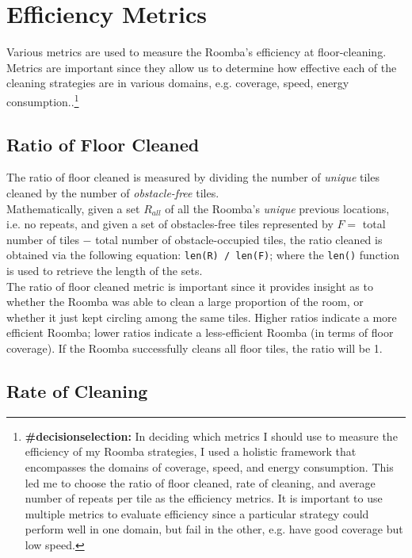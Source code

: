 \documentclass[11pt]{article}
\begin{document}
\section{Efficiency Metrics}

Various metrics are used to measure the Roomba's efficiency at
floor-cleaning. Metrics are important since they allow us to determine
how effective each of the cleaning strategies are in various domains,
e.g. coverage, speed, energy consumption..\footnote{\textbf{\#decisionselection:} In deciding which metrics I should use to measure the efficiency of my Roomba strategies, I used a holistic framework that encompasses the domains of coverage, speed, and energy consumption. This led me to choose the ratio of floor cleaned, rate of cleaning, and average number of repeats per tile as the efficiency metrics. It is important to use multiple metrics to evaluate efficiency since a particular strategy could perform well in one domain, but fail in the other, e.g. have good coverage but low speed.}

\subsection{Ratio of Floor Cleaned}

The ratio of floor cleaned is measured by dividing the number of
\emph{unique} tiles cleaned by the number of \emph{obstacle-free} tiles.\\

Mathematically, given a set \(R_{all}\) of all the Roomba's
\emph{unique} previous locations, i.e. no repeats, and given a set of
obstacles-free tiles represented by \(F =\) total number of tiles \(-\)
total number of obstacle-occupied tiles, the ratio cleaned is obtained
via the following equation: \texttt{len(R)\ /\ len(F)}; where the
\texttt{len()} function is used to retrieve the length of the sets.\\

The ratio of floor cleaned metric is important since it provides insight
as to whether the Roomba was able to clean a large proportion of the
room, or whether it just kept circling among the same tiles. Higher
ratios indicate a more efficient Roomba; lower ratios indicate a
less-efficient Roomba (in terms of floor coverage). If the Roomba
successfully cleans all floor tiles, the ratio will be 1.

\subsection{Rate of Cleaning}
\end{document}
